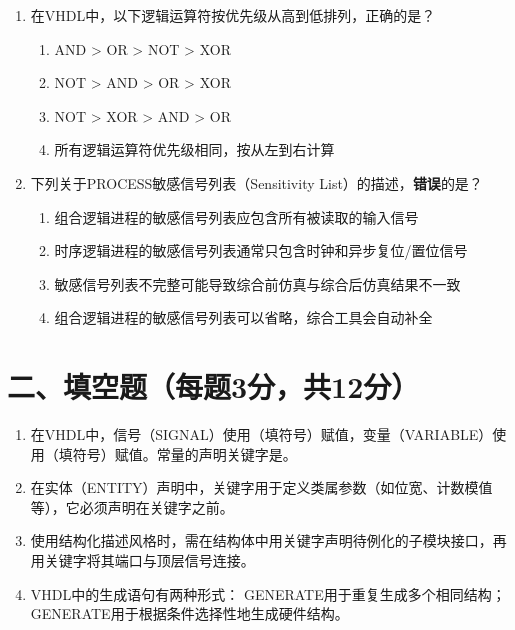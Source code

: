 \begin{enumerate}[label=\arabic*.]
\item 在VHDL中，以下逻辑运算符按优先级从高到低排列，正确的是？
\begin{enumerate}[label=\Alph*.]
  \item AND > OR > NOT > XOR
  \item NOT > AND > OR > XOR
  \item NOT > XOR > AND > OR
  \item 所有逻辑运算符优先级相同，按从左到右计算
\end{enumerate}

\item 下列关于PROCESS敏感信号列表（Sensitivity List）的描述，\textbf{错误}的是？
\begin{enumerate}[label=\Alph*.]
  \item 组合逻辑进程的敏感信号列表应包含所有被读取的输入信号
  \item 时序逻辑进程的敏感信号列表通常只包含时钟和异步复位/置位信号
  \item 敏感信号列表不完整可能导致综合前仿真与综合后仿真结果不一致
  \item 组合逻辑进程的敏感信号列表可以省略，综合工具会自动补全
\end{enumerate}

\end{enumerate}

\section*{二、填空题（每题3分，共12分）}

\begin{enumerate}[label=\arabic*.]

\item 在VHDL中，信号（SIGNAL）使用\underline{\hspace{1.5cm}}（填符号）赋值，变量（VARIABLE）使用\underline{\hspace{1.5cm}}（填符号）赋值。常量的声明关键字是\underline{\hspace{2cm}}。

\item 在实体（ENTITY）声明中，关键字\underline{\hspace{2.5cm}}用于定义类属参数（如位宽、计数模值等），它必须声明在关键字\underline{\hspace{2.5cm}}之前。

\item 使用结构化描述风格时，需在结构体中用关键字\underline{\hspace{3cm}}声明待例化的子模块接口，再用关键字\underline{\hspace{2.5cm}}将其端口与顶层信号连接。

\item VHDL中的生成语句有两种形式：\underline{\hspace{2cm}} GENERATE用于重复生成多个相同结构；\underline{\hspace{2cm}} GENERATE用于根据条件选择性地生成硬件结构。

\end{enumerate}

